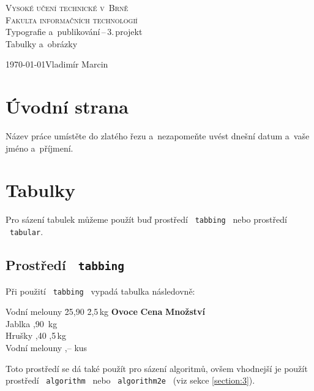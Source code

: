\documentclass[11pt,a4paper,titlepage]{article}
\begin{document}
\begin{titlepage}
	\begin{center}
		{\Huge\textsc{Vysoké učení technické v~Brně}} \\ 
		 \medskip
		{\huge\textsc{Fakulta informačních technologií}} \\
		{\LARGE{Typografie a~publikování\,--\,3.\,projekt}} \\
		 \medskip
		{\Huge Tabulky a~obrázky}\\
	\end{center}
{\Large\today \hfill Vladimír Marcin}
\end{titlepage}

\section{Úvodní strana}
Název práce umístěte do zlatého řezu a~nezapomeňte uvést dnešní datum a~vaše jméno a~příjmení.
\section{Tabulky}
Pro sázení tabulek můžeme použít buď prostředí \ \texttt{tabbing} \ nebo prostředí \ \texttt{tabular}.
\subsection{Prostředí \ \texttt{tabbing}}
Při použití \ \texttt{tabbing} \ vypadá tabulka následovně:
\begin{tabbing}
Vodní melouny \quad \= 25,90 \quad \= 2,5\,kg \quad \kill
\textbf{Ovoce} \> \textbf{Cena} \> \textbf{Množství} \\
Jablka ,90 \,kg \\
Hrušky ,40 ,5\,kg\\
Vodní melouny ,--  kus
\end{tabbing}
\bigskip
Toto prostředí se dá také použít pro sázení algoritmů, ovšem vhodnejší je použít prostředí \ \texttt{algorithm} \ 
nebo \ \texttt{algorithm2e} \ (viz sekce \ref{section:3}).
\end{document}
